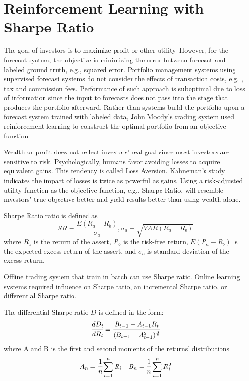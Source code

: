 \section{Reinforcement Learning with Sharpe Ratio}
The goal of investors is to maximize profit or other utility. However, for the forecast system, the objective is minimizing the error between forecast and labeled ground truth, e.g., squared error. Portfolio management systems using supervised forecast systems do not consider the effects of transaction costs, e.g. , tax and commission fees. Performance of such approach is suboptimal due to loss of information since the input to forecasts does not pass into the stage that produces the portfolio afterward.
Rather than systems build the portfolio upon a forecast system trained with labeled data, John Moody's trading system used reinforcement learning to construct the optimal portfolio from an objective function\cite{618952,moody1998performance}.
\par
Wealth or profit does not reflect investors' real goal since most investors are sensitive to risk. Psychologically, humans favor avoiding losses to acquire equivalent gains. This tendency is called Loss Aversion.\cite{kahneman2000analysis} Kahneman's study indicates the impact of losses is twice as powerful as gains\cite{Tversky1992}. Using a risk-adjusted utility function as the objective function, e.g., Sharpe Ratio, will resemble investors' true objective better and yield results better than using wealth alone.
\par
Sharpe Ratio ratio is defined as 
\[ SR = \frac{E(R_a - R_b)}{\sigma_a},
\sigma_a = \sqrt{VAR(R_a-R_b)}\]
where \(R_a\) is the return of the assert, 
\(R_b\) is the risk-free return,
\(E(R_a - R_b)\) is the expected excess return of the assert,
and \(\sigma_a\) is standard deviation of the excess return.
\par
Offline trading system that train in batch can use Sharpe ratio. 
Online learning systems required influence on Sharpe ratio, an incremental Sharpe ratio, or differential Sharpe ratio.

The differential Sharpe ratio \(D\) is defined in the form:
\[
\cfrac{d D_t}{d R_t} = 
\cfrac{B_{t-1}-A_{t-1} R_t}{(B_{t-1}-A_{t-1}^2)^\frac{3}{2}}
\]
where
A and B is the first and second moments of the returns' distributions
\[ A_n = \cfrac{1}{n}\sum_{i=1}^nR_i\quad
B_n = \cfrac{1}{n}\sum_{i=1}^nR_i^2
\]